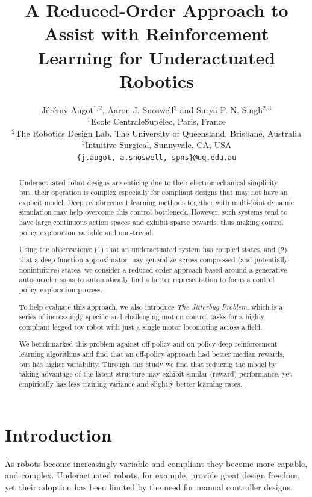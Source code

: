 \documentclass{article}
\title{
    A Reduced-Order Approach to Assist with Reinforcement Learning for Underactuated Robotics
}
\author{J\'er\'emy Augot$^{1,2}$, Aaron J. Snoswell$^{2}$ and Surya P. N. Singh$^{2,3}$
\\ $^{1}$Ecole CentraleSup\'elec, Paris, France
\\ $^{2}$The Robotics Design Lab, The University of Queensland, Brisbane, Australia
\\ $^{3}$Intuitive Surgical, Sunnyvale, CA, USA
\\ {\texttt{\{j.augot, a.snoswell, spns\}@uq.edu.au}}}
\begin{document}
\maketitle

\begin{abstract}

Underactuated robot designs are enticing due to their electromechanical simplicity; but, their operation is complex especially for compliant designs that may not have an explicit model.
Deep reinforcement learning methods together with multi-joint dynamic simulation may help overcome this control bottleneck.
However, such systems tend to have large continuous action spaces and exhibit sparse rewards, thus making control policy exploration variable and non-trivial.  

Using the observations: (1) that an underactuated system has coupled states, and (2) that a deep function approximator may generalize across compressed (and potentially nonintuitive) states, we consider a reduced order approach based around a generative autoencoder so as to automatically find a better representation to focus a control policy exploration process. 

To help evaluate this approach, we also introduce \emph{The Jitterbug Problem}, which is a series of increasingly specific and challenging motion control tasks for a highly compliant legged toy robot with just a single motor locomoting across a field.  

We benchmarked this problem against off-policy and on-policy deep reinforcement learning algorithms and find that an off-policy approach had better median rewards, but has higher variability. 
Through this study we find that reducing the model by taking advantage of the latent structure may exhibit similar (reward) performance, yet empirically has less training variance and slightly better learning rates.

\end{abstract}

\section{Introduction}

As robots become increasingly variable and compliant they become more capable, and complex.
Underactuated robots, for example, provide great design freedom, yet their adoption has been limited by the need for manual controller designs.
\end{document}
